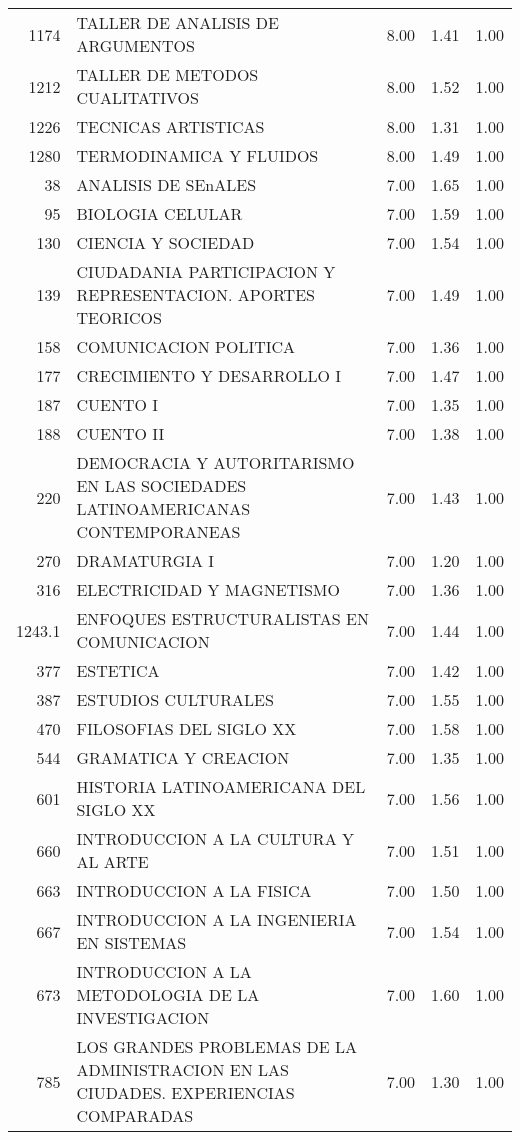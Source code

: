 \documentclass[12pt]{article}
\begin{document}
\begin{table}[ht]
\begin{tabular}{rlrrr}
  1174 & TALLER DE ANALISIS DE ARGUMENTOS & 8.00 & 1.41 & 1.00 \\ 
  1212 & TALLER DE METODOS CUALITATIVOS & 8.00 & 1.52 & 1.00 \\ 
  1226 & TECNICAS ARTISTICAS & 8.00 & 1.31 & 1.00 \\ 
  1280 & TERMODINAMICA Y FLUIDOS & 8.00 & 1.49 & 1.00 \\ 
  38 & ANALISIS DE SEnALES & 7.00 & 1.65 & 1.00 \\ 
  95 & BIOLOGIA CELULAR & 7.00 & 1.59 & 1.00 \\ 
  130 & CIENCIA Y SOCIEDAD & 7.00 & 1.54 & 1.00 \\ 
  139 & CIUDADANIA PARTICIPACION Y REPRESENTACION. APORTES TEORICOS & 7.00 & 1.49 & 1.00 \\ 
  158 & COMUNICACION POLITICA & 7.00 & 1.36 & 1.00 \\ 
  177 & CRECIMIENTO Y DESARROLLO I & 7.00 & 1.47 & 1.00 \\ 
  187 & CUENTO I & 7.00 & 1.35 & 1.00 \\ 
  188 & CUENTO II & 7.00 & 1.38 & 1.00 \\ 
  220 & DEMOCRACIA Y AUTORITARISMO EN LAS SOCIEDADES LATINOAMERICANAS CONTEMPORANEAS & 7.00 & 1.43 & 1.00 \\ 
  270 & DRAMATURGIA I & 7.00 & 1.20 & 1.00 \\ 
  316 & ELECTRICIDAD Y MAGNETISMO & 7.00 & 1.36 & 1.00 \\ 
  1243.1 & ENFOQUES ESTRUCTURALISTAS EN COMUNICACION & 7.00 & 1.44 & 1.00 \\ 
  377 & ESTETICA & 7.00 & 1.42 & 1.00 \\ 
  387 & ESTUDIOS CULTURALES & 7.00 & 1.55 & 1.00 \\ 
  470 & FILOSOFIAS DEL SIGLO XX & 7.00 & 1.58 & 1.00 \\ 
  544 & GRAMATICA Y CREACION & 7.00 & 1.35 & 1.00 \\ 
  601 & HISTORIA LATINOAMERICANA DEL SIGLO XX & 7.00 & 1.56 & 1.00 \\ 
  660 & INTRODUCCION A LA CULTURA Y AL ARTE & 7.00 & 1.51 & 1.00 \\ 
  663 & INTRODUCCION A LA FISICA & 7.00 & 1.50 & 1.00 \\ 
  667 & INTRODUCCION A LA INGENIERIA EN SISTEMAS & 7.00 & 1.54 & 1.00 \\ 
  673 & INTRODUCCION A LA METODOLOGIA DE LA INVESTIGACION & 7.00 & 1.60 & 1.00 \\ 
  785 & LOS GRANDES PROBLEMAS DE LA ADMINISTRACION EN LAS CIUDADES. EXPERIENCIAS COMPARADAS & 7.00 & 1.30 & 1.00 \\ 

\end{tabular}
\end{table}
\end{document}
